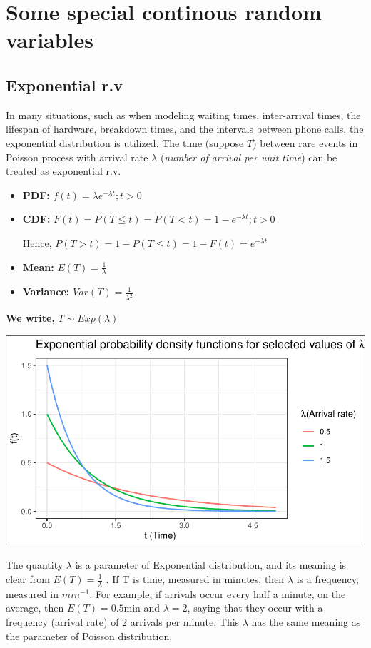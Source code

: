 \documentclass[
]{article}
\begin{document}
\section{Some special continous random variables}\label{some-special-continous-random-variables}

\subsection{Exponential r.v}\label{exponential-r.v}

In many situations, such as when modeling waiting times, inter-arrival times, the lifespan of hardware, breakdown times, and the intervals between phone calls, the exponential distribution is utilized. The time (suppose \(T\)) between rare events in Poisson process with arrival rate \(\lambda\) (\emph{number of arrival per unit time}) can be treated as exponential r.v.

\begin{itemize}
\item
  \textbf{PDF:} \(f(t)=\lambda e^{-\lambda t}; t> 0\)
\item
  \textbf{CDF:} \(F(t)=P(T\le t)=P(T< t)=1-e^{-\lambda t}; t> 0\)

  Hence, \(P(T> t)=1-P(T\le t)=1-F(t)=e^{-\lambda t}\)
\item
  \textbf{Mean:} \(E(T)=\frac{1}{\lambda}\)
\item
  \textbf{Variance:} \(Var(T)=\frac{1}{\lambda^2}\)
\end{itemize}

\textbf{We write,} \(T\sim Exp(\lambda)\)

\includegraphics{_main_files/figure-latex/unnamed-chunk-7-1.pdf}

The quantity \(\lambda\) is a parameter of Exponential distribution, and its meaning is clear from \(E(T) = \frac{1}{\lambda}\) . If T is time, measured in minutes, then \(\lambda\) is a frequency, measured in \(min^{-1}\). For example, if arrivals occur every half a minute, on the average, then \(E(T) = 0.5\)min and \(\lambda=2\), saying that they occur with a frequency (arrival rate) of 2 arrivals per minute. This \(\lambda\) has the same meaning as the parameter of Poisson distribution\citep{baron_probability_2019}.
\end{document}
